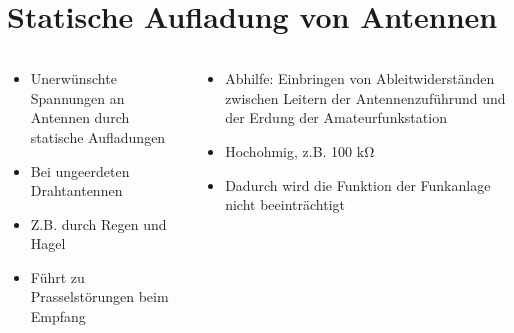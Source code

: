 
\section{Statische Aufladung von Antennen}
\label{section:statische_aufladung}
\begin{frame}%

\begin{columns}
    \begin{column}{0.48\textwidth}
    \begin{itemize}
  \item Unerwünschte Spannungen an Antennen durch statische Aufladungen
  \item Bei ungeerdeten Drahtantennen
  \item Z.B. durch Regen und Hagel
  \item Führt zu Prasselstörungen beim Empfang
  \end{itemize}

    \end{column}
   \begin{column}{0.48\textwidth}
       \begin{itemize}
  \item Abhilfe: Einbringen von Ableitwiderständen zwischen Leitern der Antennenzuführund und der Erdung der Amateurfunkstation
  \item Hochohmig, z.B. 100 kΩ
  \item Dadurch wird die Funktion der Funkanlage nicht beeinträchtigt
  \end{itemize}

   \end{column}
\end{columns}

\end{frame}

